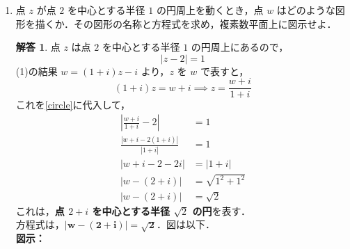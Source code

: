 \documentclass[dvipdfmx]{jlreq}
\theoremstyle{definition}
\newtheorem*{solution}{解答}
\begin{document}
\begin{enumerate}[label=(\arabic*)]
    \item 点 $z$ が点 $2$ を中心とする半径 $1$ の円周上を動くとき，点 $w$ はどのような図形を描くか．その図形の名称と方程式を求め，複素数平面上に図示せよ．
    \begin{solution}
    点 $z$ は点 $2$ を中心とする半径 $1$ の円周上にあるので，
    \begin{equation}
       |z - 2| = 1  \label{circle}
    \end{equation}
    (1)の結果 $w = (1+i)z - i$ より，$z$ を $w$ で表すと，
    \[ (1+i)z = w + i \implies z = \frac{w+i}{1+i} \]
    これを\ref{circle}に代入して，
    \begin{align*}
        \left| \frac{w+i}{1+i} - 2 \right| &= 1 \\
        \frac{|w+i - 2(1+i)|}{|1+i|} &= 1 \\
        |w + i - 2 - 2i| &= |1+i| \\
        |w - (2+i)| &= \sqrt{1^2+1^2} \\
        |w - (2+i)| &= \sqrt{2}
    \end{align*}
    これは，\textbf{点 $2+i$ を中心とする半径 $\sqrt{2}$ の円}を表す．\\
    方程式は，$\bm{|w - (2+i)| = \sqrt{2}}$．図は以下．\\
    \textbf{図示：}
    \begin{center}
    \end{center}
    \end{solution}


\end{enumerate}
\end{document}
